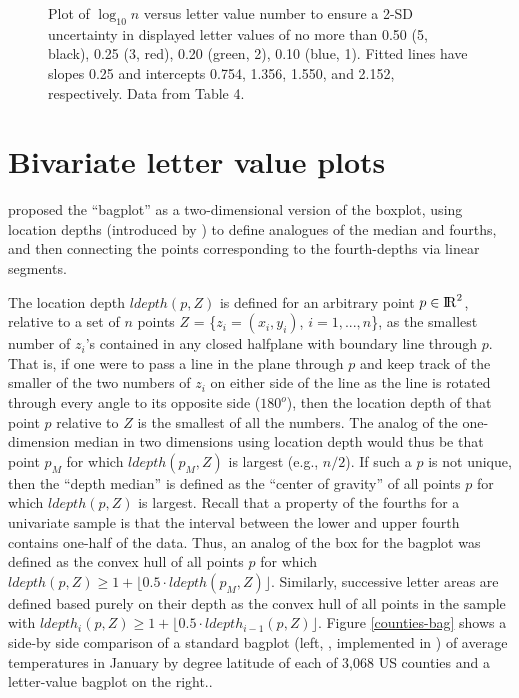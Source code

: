 \documentclass[oneside]{article}
\newcommand{\Reals}{{\rm I\kern-.1667em{}R}}
\begin{document}
\begin{figure}[hbtp]
  \centering

  \caption{Plot of $\log_10 n$ versus letter value number to ensure a 2-SD
  uncertainty in displayed letter values of no more than 0.50 (5, black), 0.25
  (3, red), 0.20 (green, 2), 0.10 (blue, 1). Fitted lines have slopes 0.25 and
  intercepts 0.754, 1.356, 1.550, and 2.152, respectively. Data from Table 4.}
  \label{figyy} 
\end{figure}

\section{Bivariate letter value plots}
\label{sec:bivariate}

\citet{bagplots} proposed the ``bagplot'' as a two-dimensional version of the boxplot, using location depths (introduced by \citet{tukey75}) to define analogues of the median and fourths, and then connecting the points corresponding to the fourth-depths via linear segments. 

The location depth $ldepth(p,Z)$ is defined for an arbitrary point $p \in \Reals^2$, relative to a set of $n$ points $Z$ = \{$z_i = (x_i, y_i)$, $i = 1,...,n$\}, as the smallest number of $z_i$'s contained in any closed halfplane with boundary line through $p$. That is, if one were to pass a line in the plane through $p$ and keep track of the smaller of the two numbers of $z_i$ on either side of the line as the line is rotated through every angle to its opposite side ($180^o$), then the location depth of that point $p$ relative to $Z$ is the smallest of all the numbers. The analog of the one-dimension median in two dimensions using location depth would thus be that point $p_M$ for which $ldepth(p_M, Z)$ is largest (e.g., $n/2$). If such a $p$ is not unique, then the ``depth median'' is defined as the ``center of gravity'' of all points $p$ for which $ldepth(p,Z)$ is largest. Recall that a property of the fourths for a univariate sample is that the interval between the lower and upper fourth contains one-half of the data. Thus, an analog of the box for the bagplot was defined as the convex hull of all points $p$ for which $ldepth(p,Z) \ge 1 +  \lfloor 0.5 \cdot  ldepth(p_M, Z) \rfloor$. Similarly,  successive letter areas are defined based purely on their depth as the convex hull of all points in the sample with $ldepth_i(p,Z) \ge 1 +  \lfloor 0.5 \cdot  ldepth_{i-1}(p, Z) \rfloor$.
Figure \ref{counties-bag} shows a side-by side comparison of a standard bagplot (left, \citet{bagplots}, implemented in \citet{aplpack}) of average temperatures in January by degree latitude of each of 3,068 US counties and a letter-value bagplot on the right..
\end{document}
